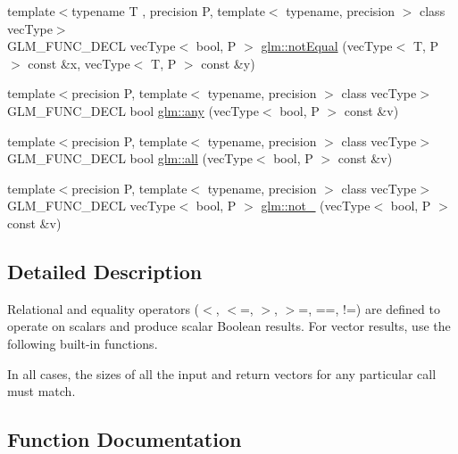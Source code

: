 \begin{DoxyCompactItemize}
\item 
{\footnotesize template$<$typename T , precision P, template$<$ typename, precision $>$ class vec\+Type$>$ }\\G\+L\+M\+\_\+\+F\+U\+N\+C\+\_\+\+D\+E\+CL vec\+Type$<$ bool, P $>$ \hyperlink{group__core__func__vector__relational_ga5aca2b745e5eb0096716bbc394846309}{glm\+::not\+Equal} (vec\+Type$<$ T, P $>$ const \&x, vec\+Type$<$ T, P $>$ const \&y)
\item 
{\footnotesize template$<$precision P, template$<$ typename, precision $>$ class vec\+Type$>$ }\\G\+L\+M\+\_\+\+F\+U\+N\+C\+\_\+\+D\+E\+CL bool \hyperlink{group__core__func__vector__relational_ga632a2644532d9332011c8860400d30b2}{glm\+::any} (vec\+Type$<$ bool, P $>$ const \&v)
\item 
{\footnotesize template$<$precision P, template$<$ typename, precision $>$ class vec\+Type$>$ }\\G\+L\+M\+\_\+\+F\+U\+N\+C\+\_\+\+D\+E\+CL bool \hyperlink{group__core__func__vector__relational_ga14bbc94f2ae2774a1d64d91f8767773e}{glm\+::all} (vec\+Type$<$ bool, P $>$ const \&v)
\item 
{\footnotesize template$<$precision P, template$<$ typename, precision $>$ class vec\+Type$>$ }\\G\+L\+M\+\_\+\+F\+U\+N\+C\+\_\+\+D\+E\+CL vec\+Type$<$ bool, P $>$ \hyperlink{group__core__func__vector__relational_ga4329ecbc2ef012c9ec704bd09da1f177}{glm\+::not\+\_\+} (vec\+Type$<$ bool, P $>$ const \&v)
\end{DoxyCompactItemize}


\subsection{Detailed Description}
Relational and equality operators ($<$, $<$=, $>$, $>$=, ==, !=) are defined to operate on scalars and produce scalar Boolean results. For vector results, use the following built-\/in functions.

In all cases, the sizes of all the input and return vectors for any particular call must match. 

\subsection{Function Documentation}
\mbox{\label{group__core__func__vector__relational_ga14bbc94f2ae2774a1d64d91f8767773e}} 

